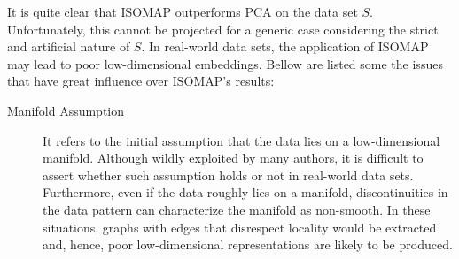 \documentclass[12pt]{report}
\begin{document}
It is quite clear that ISOMAP outperforms PCA on the data set $S$. Unfortunately, this cannot be projected for a generic case considering the strict and artificial nature of $S$. In real-world data sets, the application of ISOMAP may lead to poor low-dimensional embeddings. \cite{herik2009} Bellow are listed some the issues that have great influence over ISOMAP's results:
\begin{description}
	\item[Manifold Assumption] It refers to the initial assumption that the data lies on a low-dimensional manifold. Although wildly exploited by many authors, it is difficult to assert whether such assumption holds or not in real-world data sets. \cite{lin2008riemannian} Furthermore, even if the data roughly lies on a manifold, discontinuities in the data pattern can characterize the manifold as non-smooth. In these situations, graphs with edges that disrespect locality would be extracted and, hence, poor low-dimensional representations are likely to be produced.

	\newpage


\end{description}
\end{document}
